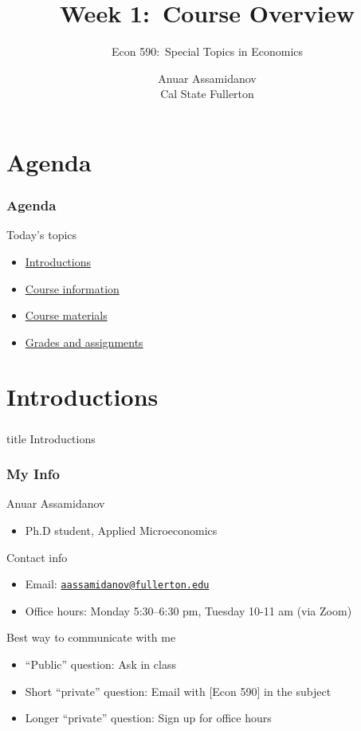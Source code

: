 \documentclass{beamer}
\title[Week 1:\ Course Overview]{Week 1:\ Course Overview}
\author[Econ 590:\ Special Topics in Economics]{Econ 590:\ Special Topics in Economics}
\date{Anuar Assamidanov\\Cal State Fullerton}
\begin{document}
{ 
\begin{frame}[noframenumbering]
    \titlepage
\end{frame}
}

\section{Agenda}
\begin{frame}\frametitle{Agenda}
    Today's topics
    \begin{itemize}
    	\item \hyperlink{page.\getpagerefnumber{introductions}}{Introductions}
        \item \hyperlink{page.\getpagerefnumber{information}}{Course information}
        \item \hyperlink{page.\getpagerefnumber{materials}}{Course materials}
        \item \hyperlink{page.\getpagerefnumber{grades}}{Grades and assignments}
    \end{itemize}
\end{frame}


\section{Introductions}
\label{introductions}
\begin{frame}\frametitle{}
    \vfill
    \centering
    \begin{beamercolorbox}[center]{title}
        \Large Introductions
    \end{beamercolorbox}
    \vfill
\end{frame}

\begin{frame}\frametitle{My Info}
    Anuar Assamidanov
    \begin{itemize}
        \item Ph.D student, Applied Microeconomics
    \end{itemize}
    \vspace{2ex}
    Contact info
    \begin{itemize}
        \item Email: \href{aassamidanov@fullerton.edu}{\texttt{aassamidanov@fullerton.edu}}
        \item Office hours: Monday 5:30--6:30 pm, Tuesday 10-11 am (via Zoom)
    \end{itemize}
    \vspace{2ex}
    Best way to communicate with me
    \begin{itemize}
        \item ``Public'' question: Ask in class
        \item Short ``private'' question: Email with [Econ 590] in the subject
        \item Longer ``private'' question: Sign up for office hours
    \end{itemize}
\end{frame}
\end{document}
